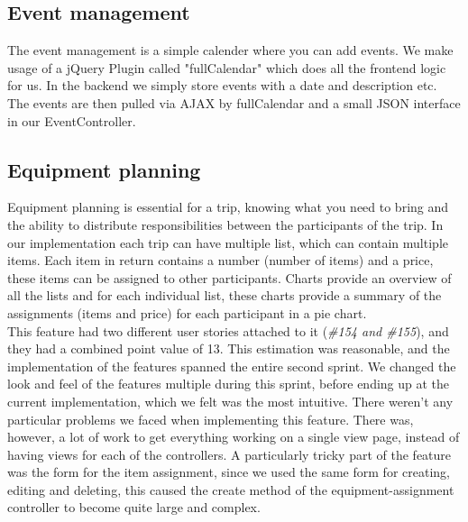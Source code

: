 \documentclass[a4paper]{article}
\begin{document}
\subsection{Event management}
The event management is a simple calender where you can add events. We make usage of a jQuery Plugin called "fullCalendar" which does all the frontend logic for us. In the backend we simply store events with a date and description etc. The events are then pulled via AJAX by fullCalendar and a small JSON interface in our EventController.

\subsection{Equipment planning}
Equipment planning is essential for a trip, knowing what you need to bring and the ability to distribute responsibilities between the participants of the trip. In our implementation each trip can have multiple list, which can contain multiple items. Each item in return contains a number (number of items) and a price, these items can be assigned to other participants. Charts provide an overview of all the lists and for each individual list, these charts provide a summary of the assignments (items and price) for each participant in a pie chart. \\ This feature had two different user stories attached to it (\emph{\#154 and \#155}), and they had a combined point value of 13. This estimation was reasonable, and the implementation of the features spanned the entire second sprint. We changed the look and feel of the features multiple during this sprint, before ending up at the current implementation, which we felt was the most intuitive. There weren't any particular problems we faced when implementing this feature. There was, however, a lot of work to get everything working on a single view page, instead of having views for each of the controllers. A particularly tricky part of the feature was the form for the item assignment, since we used the same form for creating, editing and deleting, this caused the create method of the equipment-assignment controller to become quite large and complex. 
\end{document}
